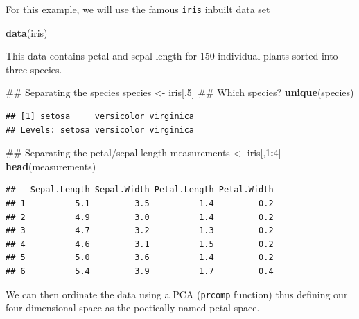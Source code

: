 \documentclass[]{book}
\newenvironment{Shaded}{\begin{snugshade}}{\end{snugshade}}
\newcommand{\KeywordTok}[1]{\textcolor[rgb]{0.13,0.29,0.53}{\textbf{#1}}}
\newcommand{\DecValTok}[1]{\textcolor[rgb]{0.00,0.00,0.81}{#1}}
\newcommand{\StringTok}[1]{\textcolor[rgb]{0.31,0.60,0.02}{#1}}
\newcommand{\OperatorTok}[1]{\textcolor[rgb]{0.81,0.36,0.00}{\textbf{#1}}}
\newcommand{\NormalTok}[1]{#1}
\theoremstyle{definition}
\theoremstyle{definition}
\theoremstyle{remark}
\begin{document}
For this example, we will use the famous \texttt{iris} inbuilt data set

\begin{Shaded}
\begin{Highlighting}[]
\KeywordTok{data}\NormalTok{(iris)}
\end{Highlighting}
\end{Shaded}

This data contains petal and sepal length for 150 individual plants
sorted into three species.

\begin{Shaded}
\begin{Highlighting}[]
\NormalTok{## Separating the species}
\NormalTok{species <-}\StringTok{ }\NormalTok{iris[,}\DecValTok{5}\NormalTok{]}
\NormalTok{## Which species?}
\KeywordTok{unique}\NormalTok{(species)}
\end{Highlighting}
\end{Shaded}

\begin{verbatim}
## [1] setosa     versicolor virginica 
## Levels: setosa versicolor virginica
\end{verbatim}

\begin{Shaded}
\begin{Highlighting}[]
\NormalTok{## Separating the petal/sepal length}
\NormalTok{measurements <-}\StringTok{ }\NormalTok{iris[,}\DecValTok{1}\OperatorTok{:}\DecValTok{4}\NormalTok{]}
\KeywordTok{head}\NormalTok{(measurements)}
\end{Highlighting}
\end{Shaded}

\begin{verbatim}
##   Sepal.Length Sepal.Width Petal.Length Petal.Width
## 1          5.1         3.5          1.4         0.2
## 2          4.9         3.0          1.4         0.2
## 3          4.7         3.2          1.3         0.2
## 4          4.6         3.1          1.5         0.2
## 5          5.0         3.6          1.4         0.2
## 6          5.4         3.9          1.7         0.4
\end{verbatim}

We can then ordinate the data using a PCA (\texttt{prcomp} function)
thus defining our four dimensional space as the poetically named
petal-space.

\begin{Shaded}
\end{Shaded}
\end{document}
